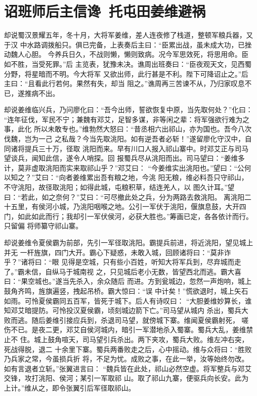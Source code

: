 \chapter{诏班师后主信谗~托屯田姜维避祸}

却说蜀汉景耀五年，冬十月，大将军姜维，差人连夜修了栈道，整顿军粮兵器，又于汉
中水路调拨船只。俱已完备，上表奏后主曰：“臣累出战，虽未成大功，已挫动魏人心胆。
今养兵日久，不战则懒，懒则致病。况今军思效死，将思用命。臣如不胜，当受死罪。”后
主览表，犹豫未决。谯周出班奏曰：“臣夜观天文，见西蜀分野，将星暗而不明。今大将军
又欲出师，此行甚是不利。陛下可降诏止之。”后主曰：“且看此行若何。果然有失，却当
阻之。”谯周再三苦谏不从，乃归家叹息不已，遂推病不出。

却说姜维临兴兵，乃问廖化曰：“吾今出师，誓欲恢复中原，当先取何处？”化曰：
“连年征伐，军民不宁；兼魏有邓艾，足智多谋，非等闲之辈：将军强欲行难为之事，此化
所以未敢专也。”维勃然大怒曰：“昔丞相六出祁山，亦为国也。吾今八次伐魏，岂为一己
之私哉？今当先取洮阳。如有逆吾者必斩！”遂留廖化守汉中，自同诸将提兵三十万，径取
洮阳而来。早有川口人报入祁山寨中。时邓艾正与司马望谈兵，闻知此信，遂令人哨探。回
报蜀兵尽从洮阳而出。司马望曰：“姜维多计，莫非虚取洮阳而实来取祁山乎？”邓艾曰：
“今姜维实出洮阳也。”望曰：“公何以知之？”艾曰：“向者姜维累出吾有粮之地，今洮
阳无粮，维必料吾只守祁山，不守洮阳，故径取洮阳；如得此城，屯粮积草，结连羌人，以
图久计耳。”望曰：“若此，如之奈何？”艾曰：“可尽撤此处之兵，分为两路去救洮阳。
离洮阳二十五里，有侯河小城，乃洮阳咽喉之地。公引一军伏于洮阳，偃旗息鼓，大开四
门，如此如此而行；我却引一军伏侯河，必获大胜也。”筹画已定，各各依计而行。只留偏
将师纂守祁山寨。

却说姜维令夏侯霸为前部，先引一军径取洮阳。霸提兵前进，将近洮阳，望见城上并无
一杆旌旗，四门大开。霸心下疑惑，未敢入城，回顾诸将曰：“莫非诈乎？”诸将曰：“眼
见得是空城，只有些小百姓，听知大将军兵到，尽弃城而走了。”霸未信，自纵马于城南视
之，只见城后老小无数，皆望西北而逃。霸大喜曰：“果空城也。”遂当先杀入，余众随后
而进。方到瓮城边，忽然一声炮响，城上鼓角齐鸣，旌旗遍竖，拽起吊桥。霸大惊曰：“误
中计矣！”慌欲退时，城上矢石如雨。可怜夏侯霸同五百军，皆死于城下。后人有诗叹曰：
“大胆姜维妙算长，谁知邓艾暗提防。可怜投汉夏侯霸，顷刻城边箭下亡。”司马望从城内
杀出，蜀兵大败而逃。随后姜维引接应兵到，杀退司马望，就傍城下寨。维闻夏侯霸射死，
嗟伤不已。是夜二更，邓艾自侯河城内，暗引一军潜地杀入蜀寨。蜀兵大乱，姜维禁止不
住。城上鼓角喧天，司马望引兵杀出。两下夹攻，蜀兵大败。维左冲右突，死战得脱，退二
十余里下寨。蜀兵两番败走之后，心中摇动。维与众将曰：“胜败乃兵家之常，今虽损兵折
将，不足为忧。成败之事，在此一举，汝等始终勿改。如有言退者立斩。”张翼进言曰：
“魏兵皆在此处，祁山必然空虚。将军整兵与邓艾交锋，攻打洮阳、侯河；某引一军取祁
山。取了祁山九寨，便驱兵向长安。此为上计。”维从之，即令张翼引后军径取祁山。

